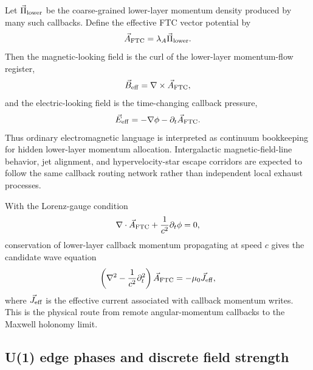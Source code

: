 \documentclass[11pt,a4paper]{article}
\begin{document}
Let \(\vec\Pi_{\rm lower}\) be the coarse-grained lower-layer momentum density
produced by many such callbacks.  Define the effective FTC vector potential by
\begin{equation}
  \vec A_{\rm FTC}=\lambda_A\vec\Pi_{\rm lower}.
  \label{eq:A_FTC_lower_momentum}
\end{equation}
Then the magnetic-looking field is the curl of the lower-layer momentum-flow
register,
\begin{equation}
  \vec B_{\rm eff}=\nabla\times\vec A_{\rm FTC},
  \label{eq:B_curl_lower_momentum}
\end{equation}
and the electric-looking field is the time-changing callback pressure,
\begin{equation}
  \vec E_{\rm eff}=-\nabla\phi-\partial_t\vec A_{\rm FTC}.
  \label{eq:E_callback_pressure}
\end{equation}
Thus ordinary electromagnetic language is interpreted as continuum bookkeeping
for hidden lower-layer momentum allocation.  Intergalactic magnetic-field-line
behavior, jet alignment, and hypervelocity-star escape corridors are expected
to follow the same callback routing network rather than independent local
exhaust processes.

With the Lorenz-gauge condition
\begin{equation}
  \nabla\cdot\vec A_{\rm FTC}+\frac{1}{c^2}\partial_t\phi=0,
  \label{eq:lorenz_ftc}
\end{equation}
conservation of lower-layer callback momentum propagating at speed \(c\) gives
the candidate wave equation
\begin{equation}
  \left(\nabla^2-\frac{1}{c^2}\partial_t^2\right)\vec A_{\rm FTC}
  =-\mu_0\vec J_{\rm eff},
  \label{eq:A_wave_callback}
\end{equation}
where \(\vec J_{\rm eff}\) is the effective current associated with callback
momentum writes.  This is the physical route from remote angular-momentum
callbacks to the Maxwell holonomy limit.

\subsection{U(1) edge phases and discrete field strength}
\end{document}
